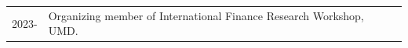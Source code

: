 \begin{longtable}[l]{@{}p{} p{}}
    2023- & Organizing member of International Finance Research Workshop, UMD.
\end{longtable}